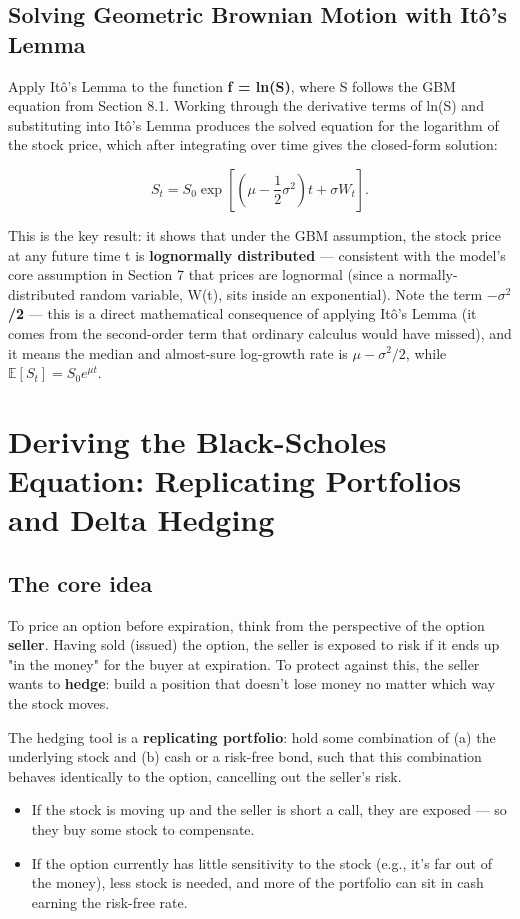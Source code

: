 \documentclass[12pt,openany]{book}
\theoremstyle{definition}
\theoremstyle{remark}
\newcommand{\E}{\mathbb{E}}
\begin{document}
\subsection{Solving Geometric Brownian Motion with Itô's Lemma}

Apply Itô's Lemma to the function \textbf{f = ln(S)}, where S follows the GBM equation from Section 8.1. Working through the derivative terms of ln(S) and substituting into Itô's Lemma produces the solved equation for the logarithm of the stock price, which after integrating over time gives the closed-form solution:

\[
S_t=S_0\exp\!\left[\left(\mu-\frac12\sigma^2\right)t+\sigma W_t\right].
\]

This is the key result: it shows that under the GBM assumption, the stock price at any future time t is \textbf{lognormally distributed} --- consistent with the model's core assumption in Section 7 that prices are lognormal (since a normally-distributed random variable, W(t), sits inside an exponential). Note the term \textbf{\(-\)\(\sigma\)\(^2\)/2} --- this is a direct mathematical consequence of applying Itô's Lemma (it comes from the second-order term that ordinary calculus would have missed), and it means the median and almost-sure log-growth rate is \(\mu-\sigma^2/2\), while \(\E[S_t]=S_0e^{\mu t}\).

\section{Deriving the Black-Scholes Equation: Replicating Portfolios and Delta Hedging}

\subsection{The core idea}

To price an option before expiration, think from the perspective of the option \textbf{seller}. Having sold (issued) the option, the seller is exposed to risk if it ends up "in the money" for the buyer at expiration. To protect against this, the seller wants to \textbf{hedge}: build a position that doesn't lose money no matter which way the stock moves.

The hedging tool is a \textbf{replicating portfolio}: hold some combination of (a) the underlying stock and (b) cash or a risk-free bond, such that this combination behaves identically to the option, cancelling out the seller's risk.

\begin{itemize}
\item If the stock is moving up and the seller is short a call, they are exposed --- so they buy some stock to compensate.


\item If the option currently has little sensitivity to the stock (e.g., it's far out of the money), less stock is needed, and more of the portfolio can sit in cash earning the risk-free rate.


\end{itemize}
\end{document}
